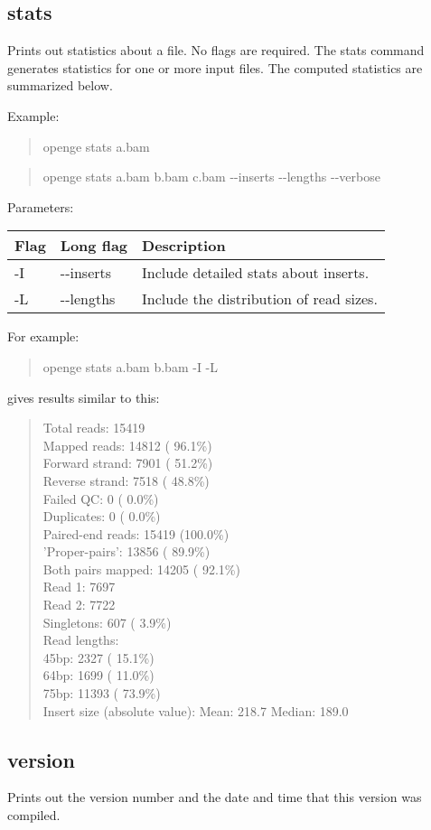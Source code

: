 \documentclass[11pt]{article}
\newcommand {\cmd}[1] {\begin{quote}#1\end{quote}}
\begin{document}
\subsection{stats}
Prints out statistics about a file. No flags are required.
The stats command generates statistics for one or more input files. The computed statistics are summarized below.

Example:

\cmd{openge stats a.bam}
\cmd{openge stats a.bam b.bam c.bam {-}{-}inserts {-}{-}lengths {-}{-}verbose}
Parameters:
\begin{center}
\begin{tabular}{llp{3.5in}}
\hline
Flag&Long flag&Description\\ \hline
-I&{-}{-}inserts&Include detailed stats about inserts.\\
-L&{-}{-}lengths&Include the distribution of read sizes.\\
\end{tabular}
\end{center}

For example:
\cmd {openge stats a.bam b.bam -I -L}
gives results similar to this:
\cmd {Total reads:            15419\\
Mapped reads:           14812 ( 96.1\%)\\
Forward strand:          7901 ( 51.2\%)\\
Reverse strand:          7518 ( 48.8\%)\\
Failed QC:                  0 (  0.0\%)\\
Duplicates:                 0 (  0.0\%)\\
Paired-end reads:       15419 (100.0\%)\\
'Proper-pairs':         13856 ( 89.9\%)\\
Both pairs mapped:      14205 ( 92.1\%)\\
Read 1:                  7697\\
Read 2:                  7722\\
Singletons:               607 (  3.9\%)\\
Read lengths:\\
    45bp:                2327 ( 15.1\%)\\
    64bp:                1699 ( 11.0\%)\\
    75bp:               11393 ( 73.9\%)\\
Insert size (absolute value):
    Mean:               218.7
    Median:             189.0}

\subsection{version}
Prints out the version number and the date and time that this version was compiled.
\end{document}
